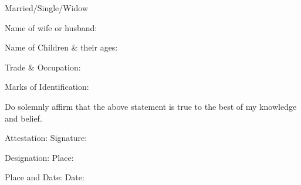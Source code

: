 \documentclass{article}
\begin{document}
Married/Single/Widow \underline{\hspace{5cm}}

Name of wife or husband: \underline{\hspace{5cm}}

Name of Children \& their ages: \underline{\hspace{5cm}}
\underline{\hspace{5cm}}
\underline{\hspace{5cm}}
\underline{\hspace{5cm}}

Trade \& Occupation: \underline{\hspace{5cm}}

Marks of Identification: \underline{\hspace{5cm}}

Do solemnly affirm that the above statement is true to the best of my knowledge and belief.

Attestation: \underline{\hspace{5cm}} \hspace{5cm} Signature: \underline{\hspace{5cm}}

Designation: \underline{\hspace{5cm}} \hspace{5cm} Place: \underline{\hspace{5cm}}

Place and Date: \underline{\hspace{5cm}} \hspace{5cm} Date: \underline{\hspace{5cm}}
\end{document}
